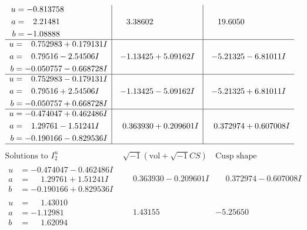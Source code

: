 \documentclass[1p]{elsarticle_modified}
\theoremstyle{definition}
\newcommand{\I}{\sqrt{-1}}
\begin{document}
$$\begin{array}{c|c|c}
\begin{aligned}
u &= -0.813758\phantom{ +0.000000I} \\
a &= \phantom{-}2.21481\phantom{ +0.000000I} \\
b &= -1.08888\phantom{ +0.000000I}\end{aligned}
 & \phantom{-}3.38602\phantom{ +0.000000I} & \phantom{-}19.6050\phantom{ +0.000000I} \\ \hline\begin{aligned}
u &= \phantom{-}0.752983 + 0.179131 I \\
a &= \phantom{-}0.79516 - 2.54506 I \\
b &= -0.050757 - 0.668728 I\end{aligned}
 & -1.13425 + 5.09162 I & -5.21325 - 6.81011 I \\ \hline\begin{aligned}
u &= \phantom{-}0.752983 - 0.179131 I \\
a &= \phantom{-}0.79516 + 2.54506 I \\
b &= -0.050757 + 0.668728 I\end{aligned}
 & -1.13425 - 5.09162 I & -5.21325 + 6.81011 I \\ \hline\begin{aligned}
u &= -0.474047 + 0.462486 I \\
a &= \phantom{-}1.29761 - 1.51241 I \\
b &= -0.190166 - 0.829536 I\end{aligned}
 & \phantom{-}0.363930 + 0.209601 I & \phantom{-}0.372974 + 0.607008 I\\
 \hline 
 \end{array}$$\newpage$$\begin{array}{c|c|c}  
\text{Solutions to }I^u_{2}& \I (\text{vol} + \sqrt{-1}CS) & \text{Cusp shape}\\
 \hline 
\begin{aligned}
u &= -0.474047 - 0.462486 I \\
a &= \phantom{-}1.29761 + 1.51241 I \\
b &= -0.190166 + 0.829536 I\end{aligned}
 & \phantom{-}0.363930 - 0.209601 I & \phantom{-}0.372974 - 0.607008 I \\ \hline\begin{aligned}
u &= \phantom{-}1.43010\phantom{ +0.000000I} \\
a &= -1.12981\phantom{ +0.000000I} \\
b &= \phantom{-}1.62094\phantom{ +0.000000I}\end{aligned}
 & \phantom{-}1.43155\phantom{ +0.000000I} & -5.25650\phantom{ +0.000000I} \\ \hline\begin{aligned}

\end{aligned}
\end{array}$$
\end{document}
